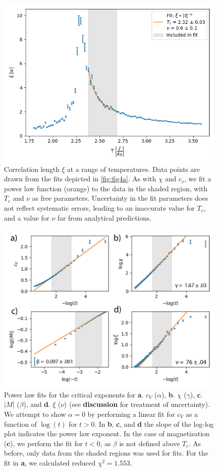 \documentclass[letter,scriptaddress,twocolumn, prl,nofootinbib]{revtex4}
\begin{document}
\begin{figure}[h]
	\begin{center}
		\includegraphics[width=.5\textwidth]{figs/fig4_xi.png}
		\caption{Correlation length $\xi$ at a range of temperatures. Data points are drawn from the fits depicted in \autoref{fig:fig4a}. As with $\chi$ and $c_v$, we fit a power law function (orange) to the data in the shaded region, with $T_c$ and $\nu$ as free parameters. Uncertainty in the fit parameters does not reflect systematic errors, leading to an inaccurate value for $T_c$, and a value for $\nu$ far from analytical predictions.}
		\label{fig:fig4b}
	\end{center}
\end{figure}

\begin{figure}[h]
	\begin{center}
		\includegraphics[width=.5\textwidth]{figs/lastfig.png}
		\caption{Power law fits for the critical exponents for \textbf{a}. $c_V$ ($\alpha$), \textbf{b}. $\chi$ ($\gamma$), \textbf{c}. $|M|$ ($\beta$), and \textbf{d}. $\xi$ ($\nu$) (see \textbf{discussion} for treatment of uncertainty). We attempt to show $\alpha = 0$ by performing a linear fit for $c_V$ as a function of $\log(t)$ for $t > 0$. In \textbf{b}, \textbf{c}, and \textbf{d} the slope of the log-log plot indicates the power law exponent. In the case of magnetization (\textbf{c}), we perform the fit for $t < 0$, as $\beta$ is not defined above $T_c$. As before, only data from the shaded regions was used for fits. For the fit in \textbf{a}, we calculated reduced $\chi^2 = 1.553$.}
		\label{fig:fig5}
	\end{center}
\end{figure}
\end{document}
